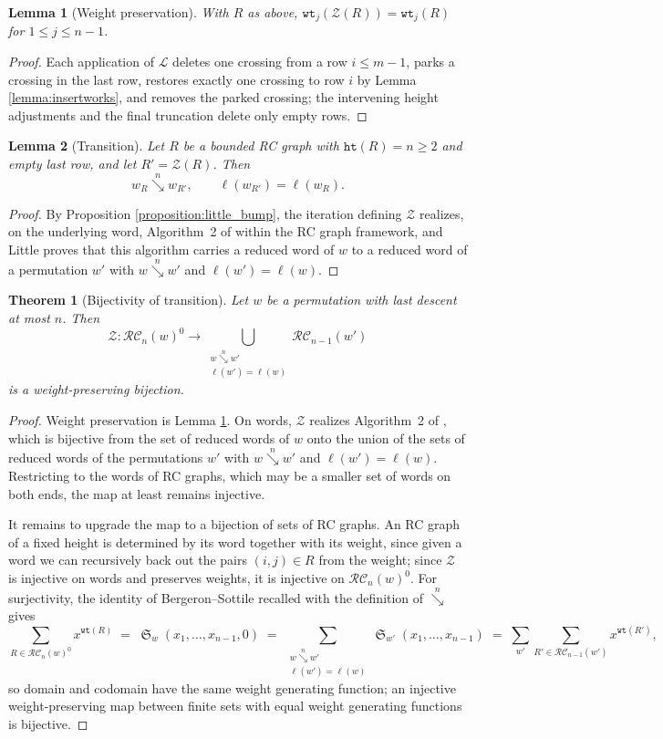 \documentclass{amsart}
\newtheorem{lemma}{Lemma}[subsection]
\newtheorem{theorem}{Theorem}[section]
\theoremstyle{definition}
\theoremstyle{remark}
\numberwithin{equation}{subsection}
\DeclareMathOperator{\sch}{\mathfrak{S}}
\newcommand{\downvar}[1]{\stackrel{#1}{\searrow}}
\newcommand{\wof}[1]{w_{#1}}
\newcommand{\wtt}{\mathtt{wt}}
\newcommand{\zeromap}{\mathcal{Z}}
\newcommand{\hr}{\mathtt{ht}}
\newcommand{\RC}{\mathcal{RC}}
\newcommand{\lmap}{\mathscr{L}}
\begin{document}
\begin{lemma}[Weight preservation]\label{lemma:zeroweight}
With $R$ as above, $\wtt_j(\zeromap(R))=\wtt_j(R)$ for $1\leq j\leq n-1$.
\end{lemma}
\begin{proof}
Each application of $\lmap$ deletes one crossing from a row $i\leq m-1$, parks a crossing in the last row, restores exactly one crossing to row $i$ by Lemma \ref{lemma:insertworks}, and removes the parked crossing; the intervening height adjustments and the final truncation delete only empty rows.
\end{proof}

\begin{lemma}[Transition]\label{lemma:zerotransition}
Let $R$ be a bounded RC graph with $\hr(R)=n\geq 2$ and empty last row, and let $R'=\zeromap(R)$. Then
$$\wof{R}\downvar{n}\wof{R'},\qquad \ell(\wof{R'})=\ell(\wof R).$$
\end{lemma}
\begin{proof}
By Proposition \ref{proposition:little_bump}, the iteration defining $\zeromap$ realizes, on the underlying word, Algorithm~2 of \cite{little2003combinatorial} within the RC graph framework, and Little proves that this algorithm carries a reduced word of $w$ to a reduced word of a permutation $w'$ with $w\downvar{n}w'$ and $\ell(w')=\ell(w)$.
\end{proof}

\begin{theorem}[Bijectivity of transition]\label{theorem:zero_bijection}
Let $w$ be a permutation with last descent at most $n$. Then
$$\zeromap:\RC_n(w)^{0}\to \bigcup_{\substack{w\downvar{n} w'\\\ell(w')=\ell(w)}}\RC_{n-1}(w')$$
is a weight-preserving bijection.
\end{theorem}
\begin{proof}
Weight preservation is Lemma \ref{lemma:zeroweight}. On words, $\zeromap$ realizes Algorithm~2 of \cite{little2003combinatorial}, which is bijective from the set of reduced words of $w$ onto the union of the sets of reduced words of the permutations $w'$ with $w\downvar{n}w'$ and $\ell(w')=\ell(w)$.  Restricting to the words of RC graphs, which may be a smaller set of words on both ends, the map at least remains injective.

It remains to upgrade the map to a bijection of sets of RC graphs. An RC graph of a fixed height is determined by its word together with its weight, since given a word we can recursively back out the pairs $(i,j)\in R$ from the weight; since $\zeromap$ is injective on words and preserves weights, it is injective on $\RC_n(w)^0$. For surjectivity, the identity of Bergeron--Sottile \cite{bsskew} recalled with the definition of $\downvar{n}$ gives
$$\sum_{R\in\RC_n(w)^0}x^{\wtt(R)}\;=\;\sch_w(x_1,\ldots,x_{n-1},0)\;=\;\sum_{\substack{w\downvar{n}w'\\ \ell(w')=\ell(w)}}\sch_{w'}(x_1,\ldots,x_{n-1})\;=\;\sum_{w'}\sum_{R'\in\RC_{n-1}(w')}x^{\wtt(R')},$$
so domain and codomain have the same weight generating function; an injective weight-preserving map between finite sets with equal weight generating functions is bijective.
\end{proof}
\end{document}
